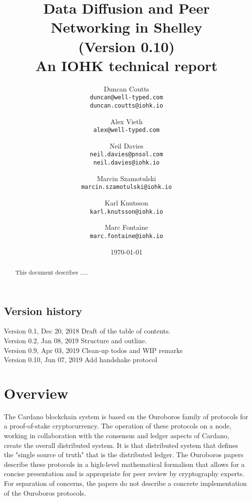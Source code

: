 \documentclass{report}
\theoremstyle{definition}{
  \newtheorem{lemma}{Lemma}[section] %
  \newtheorem{definition}[lemma]{Definition}
}
\theoremstyle{theorem}{
  \newtheorem{invariant}[lemma]{Invariant}
  \newtheorem{proofobligation}[lemma]{Proof Obligation}
}
\numberwithin{equation}{lemma}
\begin{document}
\title{Data Diffusion and Peer Networking in Shelley\\
       {\small (Version 0.10)} \\
       {\large \sc An IOHK technical report}}
\author{Duncan Coutts \\ {\small \texttt{duncan@well-typed.com}} \\
                         {\small \texttt{duncan.coutts@iohk.io}}
   \and Alex Vieth \\ {\small \texttt{alex@well-typed.com}}
   \and Neil Davies \\ {\small \texttt{neil.davies@pnsol.com}} \\
                       {\small \texttt{neil.davies@iohk.io}}
   \and Marcin Szamotulski \\ {\small \texttt{marcin.szamotulski@iohk.io}}
   \and Karl Knutsson \\ {\small \texttt{karl.knutsson@iohk.io}}
   \and Marc Fontaine \\ {\small \texttt{marc.fontaine@iohk.io}}
   }
\date{\today}

\maketitle

\begin{abstract}
  This document describes .....
\end{abstract}

\tableofcontents

\section*{Version history}

\begin{description}
\item[Version 0.1, Dec 20, 2018 Draft of the table of contents.]
\item[Version 0.2, Jan 08, 2019 Structure and outline.]
\item[Version 0.9, Apr 03, 2019 Clean-up todos and WIP remarks]
\item[Version 0.10, Jun 07, 2019 Add handshake protocol]
\end{description}

\chapter{Overview}
The Cardano blockchain system is based on the Ouroboros family of protocols
for a proof-of-stake cryptocurrency.
The operation of these protocols on a node, working in collaboration with the consensus
and ledger aspects of Cardano, create the overall distributed system.
It is that distributed system that defines the "single source of truth" that is the distributed ledger.
The Ouroboros papers describe these protocols in a high-level mathematical formalism
that allows for a concise presentation and is appropriate for peer review by cryptography experts.
For separation of concerns, the papers do not describe a concrete implementation of the Ouroboros
protocols.
\end{document}
